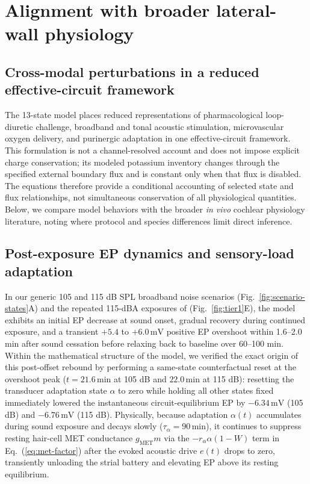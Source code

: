 \documentclass[final,5p,times]{elsarticle}
\begin{document}
\section{Alignment with broader lateral-wall physiology}\label{sec:alignment}

\subsection{Cross-modal perturbations in a reduced effective-circuit framework}\label{sec:alignment-unification}

The 13-state model places reduced representations of pharmacological loop-diuretic challenge, broadband and tonal acoustic stimulation, microvascular oxygen delivery, and purinergic adaptation in one effective-circuit framework. This formulation is not a channel-resolved account and does not impose explicit charge conservation; its modeled potassium inventory changes through the specified external boundary flux and is constant only when that flux is disabled. The equations therefore provide a conditional accounting of selected state and flux relationships, not simultaneous conservation of all physiological quantities. Below, we compare model behaviors with the broader \emph{in vivo} cochlear physiology literature, noting where protocol and species differences limit direct inference.

\subsection{Post-exposure EP dynamics and sensory-load adaptation}\label{sec:alignment-overshoot}

In our generic 105 and 115 dB SPL broadband noise scenarios (Fig.~\ref{fig:scenario-states}A) and the repeated 115-dBA exposures of \citet{SaltKonishi1979} (Fig.~\ref{fig:tier1}E), the model exhibits an initial EP decrease at sound onset, gradual recovery during continued exposure, and a transient \(+5.4\) to \(+6.0\,\mathrm{mV}\) positive EP overshoot within 1.6--2.0 min after sound cessation before relaxing back to baseline over 60--100 min. Within the mathematical structure of the model, we verified the exact origin of this post-offset rebound by performing a same-state counterfactual reset at the overshoot peak (\(t = 21.6\,\mathrm{min}\) at 105 dB and \(22.0\,\mathrm{min}\) at 115 dB): resetting the transducer adaptation state \(\alpha\) to zero while holding all other states fixed immediately lowered the instantaneous circuit-equilibrium EP by \(-6.34\,\mathrm{mV}\) (105 dB) and \(-6.76\,\mathrm{mV}\) (115 dB). Physically, because adaptation \(\alpha(t)\) accumulates during sound exposure and decays slowly (\(\tau_\alpha = 90\,\mathrm{min}\)), it continues to suppress resting hair-cell MET conductance \(g_{\mathrm{MET}}m\) via the \(-r_\alpha\alpha(1 - W)\) term in Eq.~(\ref{eq:met-factor}) after the evoked acoustic drive \(e(t)\) drops to zero, transiently unloading the strial battery and elevating EP above its resting equilibrium.
\end{document}
